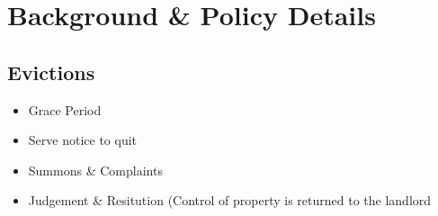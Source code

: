 \documentclass[a4paper,12pt]{article}
\begin{document}








 


\section{Background \& Policy Details}
\subsection{Evictions}
\begin{itemize}
    \item Grace Period
    \item Serve notice to quit
    \item Summons \& Complaints 
    \item Judgement \& Resitution (Control of property is returned to the landlord 
\end{itemize}
\end{document}
